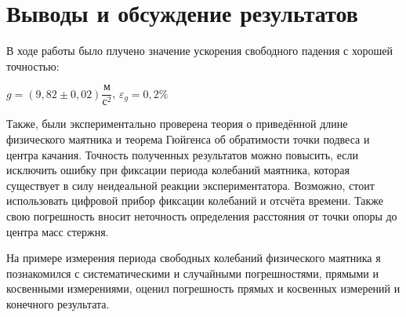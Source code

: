 \documentclass[a4paper,12pt]{article}
\begin{document}
\section{Выводы и обсуждение результатов}

В ходе работы было плучено значение ускорения свободного падения с хорошей точностью:
\begin{center}
$ g = (9,82 \pm 0,02) \dfrac{\text{м}}{\text{с}^2}$, $ \varepsilon_g=0,2\% $
\end{center}


Также, были экспериментально проверена теория о приведённой длине физического маятника и теорема Гюйгенса об обратимости точки подвеса и центра качания.
Точность полученных результатов можно повысить, если исключить ошибку при фиксации периода колебаний маятника, которая существует в силу неидеальной реакции экспериментатора. Возможно, стоит использовать цифровой прибор фиксации колебаний и отсчёта времени. Также свою погрешность вносит неточность определения расстояния от точки опоры до центра масс стержня.


На примере измерения периода свободных колебаний физического маятника я познакомился с систематическими и случайными погрешностями, прямыми и косвенными измерениями, оценил погрешность прямых и косвенных измерений и конечного результата.
\end{document}
